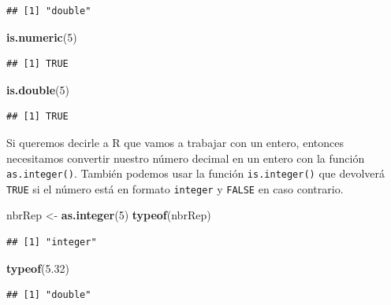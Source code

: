 \documentclass[]{book}
\newenvironment{Shaded}{\begin{snugshade}}{\end{snugshade}}
\newcommand{\KeywordTok}[1]{\textcolor[rgb]{0.13,0.29,0.53}{\textbf{#1}}}
\newcommand{\DecValTok}[1]{\textcolor[rgb]{0.00,0.00,0.81}{#1}}
\newcommand{\FloatTok}[1]{\textcolor[rgb]{0.00,0.00,0.81}{#1}}
\newcommand{\StringTok}[1]{\textcolor[rgb]{0.31,0.60,0.02}{#1}}
\newcommand{\NormalTok}[1]{#1}
\begin{document}
\begin{verbatim}
## [1] "double"
\end{verbatim}

\begin{Shaded}
\begin{Highlighting}[]
\KeywordTok{is.numeric}\NormalTok{(}\DecValTok{5}\NormalTok{)}
\end{Highlighting}
\end{Shaded}

\begin{verbatim}
## [1] TRUE
\end{verbatim}

\begin{Shaded}
\begin{Highlighting}[]
\KeywordTok{is.double}\NormalTok{(}\DecValTok{5}\NormalTok{)}
\end{Highlighting}
\end{Shaded}

\begin{verbatim}
## [1] TRUE
\end{verbatim}

Si queremos decirle a R que vamos a trabajar con un entero, entonces
necesitamos convertir nuestro número decimal en un entero con la función
\texttt{as.integer()}. También podemos usar la función
\texttt{is.integer()} que devolverá \texttt{TRUE} si el número está en
formato \texttt{integer} y \texttt{FALSE} en caso contrario.

\begin{Shaded}
\begin{Highlighting}[]
\NormalTok{nbrRep <-}\StringTok{ }\KeywordTok{as.integer}\NormalTok{(}\DecValTok{5}\NormalTok{)}
\KeywordTok{typeof}\NormalTok{(nbrRep)}
\end{Highlighting}
\end{Shaded}

\begin{verbatim}
## [1] "integer"
\end{verbatim}

\begin{Shaded}
\begin{Highlighting}[]
\KeywordTok{typeof}\NormalTok{(}\FloatTok{5.32}\NormalTok{)}
\end{Highlighting}
\end{Shaded}

\begin{verbatim}
## [1] "double"
\end{verbatim}
\end{document}
